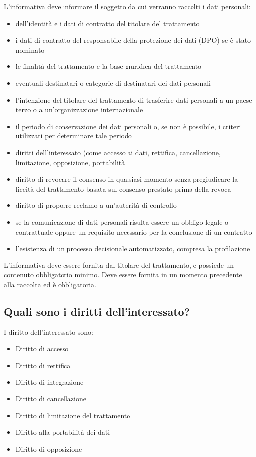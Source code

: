 L'informativa deve informare il soggetto da cui verranno raccolti i dati personali:
\begin{itemize}
    \item dell'identità e i dati di contratto del titolare del trattamento
    \item i dati di contratto del responsabile della protezione dei dati (DPO)
        se è stato nominato
    \item le finalità del trattamento e la base giuridica del trattamento
    \item eventuali destinatari o categorie di destinatari dei dati personali
    \item l'intenzione del titolare del trattamento di trasferire dati
        personali a un paese terzo o a un'organizzazione internazionale
    \item il periodo di conservazione dei dati personali o, se non è possibile,
        i criteri utilizzati per determinare tale periodo
    \item diritti dell'interessato (come accesso ai dati, rettifica,
        cancellazione, limitazione, opposizione, portabilità
    \item diritto di revocare il consenso in qualsiasi momento senza
        pregiudicare la liceità del trattamento basata sul consenso prestato
        prima della revoca
    \item diritto di proporre reclamo a un'autorità di controllo
    \item se la comunicazione di dati personali risulta essere un obbligo
        legale o contrattuale oppure un requisito necessario per la conclusione
        di un contratto
    \item l'esistenza di un processo decisionale automatizzato, compresa la profilazione
\end{itemize}
L'informativa deve essere fornita dal titolare del trattamento, e possiede un
contenuto obbligatorio minimo.
Deve essere fornita in un momento precedente alla raccolta ed è obbligatoria.

\subsection{Quali sono i diritti dell’interessato?}
I diritto dell'interessato sono:
\begin{itemize}
    \item Diritto di accesso
    \item Diritto di rettifica
    \item Diritto di integrazione
    \item Diritto di cancellazione
    \item Diritto di limitazione del trattamento
    \item Diritto alla portabilità dei dati
    \item Diritto di opposizione
\end{itemize}


